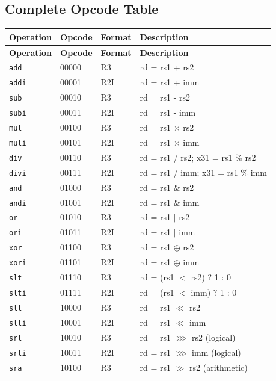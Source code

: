 \documentclass[12pt,a4paper]{article}
\begin{document}
\subsection{Complete Opcode Table}

\begin{longtable}{@{}lllp{6cm}@{}}
\toprule
\textbf{Operation} & \textbf{Opcode} & \textbf{Format} & \textbf{Description} \\
\midrule
\endfirsthead
\toprule
\textbf{Operation} & \textbf{Opcode} & \textbf{Format} & \textbf{Description} \\
\midrule
\endhead
\texttt{add}  & 00000 & R3   & rd = rs1 + rs2 \\
\texttt{addi} & 00001 & R2I  & rd = rs1 + imm \\
\texttt{sub}  & 00010 & R3   & rd = rs1 - rs2 \\
\texttt{subi} & 00011 & R2I  & rd = rs1 - imm \\
\texttt{mul}  & 00100 & R3   & rd = rs1 $\times$ rs2 \\
\texttt{muli} & 00101 & R2I  & rd = rs1 $\times$ imm \\
\texttt{div}  & 00110 & R3   & rd = rs1 / rs2; x31 = rs1 \% rs2 \\
\texttt{divi} & 00111 & R2I  & rd = rs1 / imm; x31 = rs1 \% imm \\
\texttt{and}  & 01000 & R3   & rd = rs1 \& rs2 \\
\texttt{andi} & 01001 & R2I  & rd = rs1 \& imm \\
\texttt{or}   & 01010 & R3   & rd = rs1 $|$ rs2 \\
\texttt{ori}  & 01011 & R2I  & rd = rs1 $|$ imm \\
\texttt{xor}  & 01100 & R3   & rd = rs1 $\oplus$ rs2 \\
\texttt{xori} & 01101 & R2I  & rd = rs1 $\oplus$ imm \\
\texttt{slt}  & 01110 & R3   & rd = (rs1 $<$ rs2) ? 1 : 0 \\
\texttt{slti} & 01111 & R2I  & rd = (rs1 $<$ imm) ? 1 : 0 \\
\texttt{sll}  & 10000 & R3   & rd = rs1 $\ll$ rs2 \\
\texttt{slli} & 10001 & R2I  & rd = rs1 $\ll$ imm \\
\texttt{srl}  & 10010 & R3   & rd = rs1 $\ggg$ rs2 (logical) \\
\texttt{srli} & 10011 & R2I  & rd = rs1 $\ggg$ imm (logical) \\
\texttt{sra}  & 10100 & R3   & rd = rs1 $\gg$ rs2 (arithmetic) \\

\end{longtable}
\end{document}
